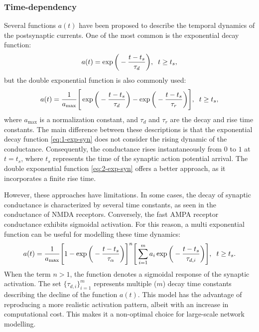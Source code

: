 \documentclass[../main.tex]{subfiles}
\begin{document}
\subsubsection{Time-dependency}
Several functions $a(t)$ have been proposed to describe the temporal dynamics of the postsynaptic currents.
One of the most common is the exponential decay function:
\begin{equation}
    a(t) = \exp{\bigg(-\displaystyle\frac{t-t_s}{\tau_d}}\bigg), \hspace{2mm} t \ge t_s,
    \label{eq:1-exp-syn}
\end{equation}
but the double exponential function is also commonly used:
\begin{equation}
    a(t) = \displaystyle\frac{1}{a_{\text{max}}}\Bigg[ 
    \exp{\bigg( -\displaystyle\frac{t-t_s}{\tau_d}\bigg)}
    -     \exp{\bigg( -\displaystyle\frac{t-t_s}{\tau_r}\bigg)}
    \Bigg], \hspace{2mm} t \ge t_s,
    \label{eq:2-exp-syn}
\end{equation}
where $a_{\text{max}}$ is a normalization constant, and $\tau_d$ and $\tau_r$ are the decay and rise time constants. 
The main difference between these descriptions is that the exponential decay function \eqref{eq:1-exp-syn} does not consider the rising dynamic of the conductance.
Consequently, the conductance rises instantaneously from $0$ to $1$ at $t=t_s$, where $t_s$ represents the time of the synaptic action potential arrival.
The double exponential function \eqref{eq:2-exp-syn} offers a better approach, as it incorporates a finite rise time.

However, these approaches have limitations.
In some cases, the decay of synaptic conductance is characterized by several time constants, as seen in the conductance of NMDA receptors.
Conversely, the fast AMPA receptor conductance exhibits sigmoidal activation.
For this reason, a multi exponential function can be useful for modelling these time dynamics:
\clearpage
\begin{equation}
    a(t) = \displaystyle\frac{1}{a_{\text{max}}}
    \Bigg[1-\exp{\bigg(-\displaystyle\frac{t-t_s}{\tau_\alpha}\bigg) }\Bigg]^{n}
    \Bigg[ \displaystyle\sum_{i=1}^{m} a_i\exp{\bigg(-\displaystyle\frac{t-t_s}{\tau_{d,i}} \bigg)} \Bigg], \hspace{2mm} t \ge t_s.
    \label{eq:multiexp-syn}
\end{equation}
When the term $n>1$, the function denotes a sigmoidal response of the synaptic activation.
The set $\{\tau_{d,i}\}_{i=1}^{m}$ represents multiple ($m$) decay time constants describing the decline of the function $a(t)$. 
This model has the advantage of reproducing a more realistic activation pattern, albeit with an increase in computational cost.
This makes it a non-optimal choice for large-scale network modelling. 
\end{document}
